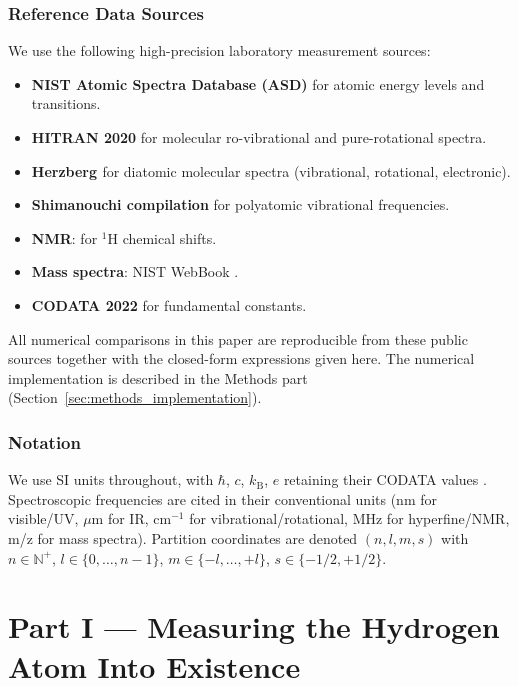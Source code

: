 \documentclass[11pt,a4paper]{article}
\theoremstyle{stmtstyle}
\theoremstyle{definition}
\theoremstyle{remark}
\newcommand{\kB}{k_{\mathrm{B}}}
\newcommand{\Natural}{\mathbb{N}}
\begin{document}
\section{Reference Data Sources}
\label{sec:sources}

We use the following high-precision laboratory measurement sources:
\begin{itemize}[nosep]
\item \textbf{NIST Atomic Spectra Database (ASD)} \citep{nistasd2023} for atomic energy levels and transitions.
\item \textbf{HITRAN 2020} \citep{hitran2020} for molecular ro-vibrational and pure-rotational spectra.
\item \textbf{Herzberg \citep{herzberg1944,herzberg1950}} for diatomic molecular spectra (vibrational, rotational, electronic).
\item \textbf{Shimanouchi compilation} \citep{shimanouchi1972} for polyatomic vibrational frequencies.
\item \textbf{NMR}: \citet{harris2002} for $^{1}$H chemical shifts.
\item \textbf{Mass spectra}: NIST WebBook \citep{nistwebbook}.
\item \textbf{CODATA 2022} \citep{codata2022} for fundamental constants.
\end{itemize}

All numerical comparisons in this paper are reproducible from these public sources together with the closed-form expressions given here. The numerical implementation is described in the Methods part (Section~\ref{sec:methods_implementation}).

\section{Notation}
\label{sec:notation}

We use SI units throughout, with $\hbar$, $c$, $\kB$, $e$ retaining their CODATA values \citep{codata2022}. Spectroscopic frequencies are cited in their conventional units (nm for visible/UV, $\mu$m for IR, cm$^{-1}$ for vibrational/rotational, MHz for hyperfine/NMR, m/z for mass spectra). Partition coordinates are denoted $(n, l, m, s)$ with $n \in \Natural^{+}$, $l \in \{0, \ldots, n-1\}$, $m \in \{-l, \ldots, +l\}$, $s \in \{-1/2, +1/2\}$.

\clearpage

\part*{Part I --- Measuring the Hydrogen Atom Into Existence}
\end{document}
